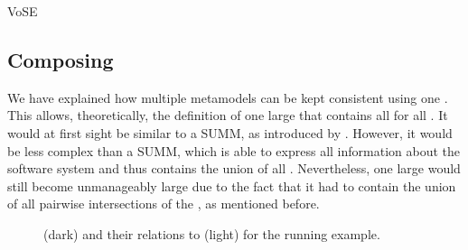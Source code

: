 \begin{copiedFrom}{VoSE}


\subsection{Composing \commonalities}

We have explained how multiple metamodels can be kept consistent using one \conceptmetamodel.
This allows, theoretically, the definition of one large \conceptmetamodel that contains all \commonalities for all \concretemetamodels.
It would at first sight be similar to a \gls{SUMM}, as introduced by \textcite{atkinson2010a}.
However, it would be less complex than a \gls{SUMM}, which is able to express all information about the software system and thus contains the union of all \concretemetamodels.
Nevertheless, one large \conceptmetamodel would still become unmanageably large due to the fact that it had to contain the union of all pairwise intersections of the \concretemetamodels, as mentioned before.

\begin{figure}
    \centering
    
    \caption[Concept metamodels for the running example]{\Conceptmetamodels (dark) and their relations to \concretemetamodels (light) for the running example.}
    \label{fig:quality:composed_commonalities_example}
\end{figure}


\end{copiedFrom}
